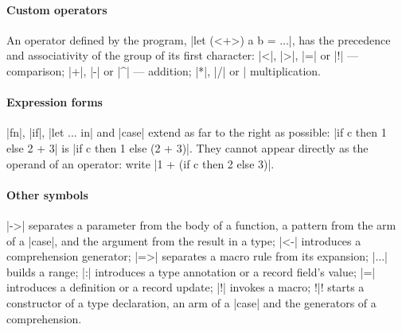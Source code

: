 \paragraph{Custom operators} An operator defined by the program,
\fc|let (<+>) a b = ...|, has the precedence and associativity of the group
of its first character: \fc|<|, \fc|>|, \fc|=| or \fc|!| --- comparison;
\fc|+|, \fc|-| or \fc|^| --- addition; \fc|*|, \fc|/| or \fc|%
multiplication.

\paragraph{Expression forms} \fc|fn|, \fc|if|, \fc|let ... in| and
\fc|case| extend as far to the right as possible: \fc|if c then 1 else 2 + 3|
is \fc|if c then 1 else (2 + 3)|. They cannot appear directly as the operand
of an operator: write \fc|1 + (if c then 2 else 3)|.

\paragraph{Other symbols} \fc|->| separates a parameter from the body of
a function, a pattern from the arm of a \fc|case|, and the argument from the
result in a type; \fc|<-| introduces a comprehension generator;
\fc|=>| separates a macro rule from its expansion; \fc|...| builds a range;
\fc|:| introduces a type annotation or a record field's value; \fc|=|
introduces a definition or a record update; \fc|!| invokes a macro;
\fc!|! starts a constructor of a type declaration, an arm of a \fc|case| and
the generators of a comprehension.
